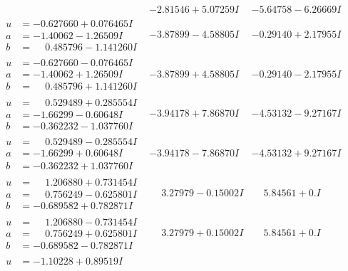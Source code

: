 \documentclass[1p]{elsarticle_modified}
\theoremstyle{definition}
\begin{document}
$$\begin{array}{c|c|c}
 & -2.81546 + 5.07259 I & -5.64758 - 6.26669 I \\ \hline\begin{aligned}
u &= -0.627660 + 0.076465 I \\
a &= -1.40062 - 1.26509 I \\
b &= \phantom{-}0.485796 - 1.141260 I\end{aligned}
 & -3.87899 - 4.58805 I & -0.29140 + 2.17955 I \\ \hline\begin{aligned}
u &= -0.627660 - 0.076465 I \\
a &= -1.40062 + 1.26509 I \\
b &= \phantom{-}0.485796 + 1.141260 I\end{aligned}
 & -3.87899 + 4.58805 I & -0.29140 - 2.17955 I \\ \hline\begin{aligned}
u &= \phantom{-}0.529489 + 0.285554 I \\
a &= -1.66299 - 0.60648 I \\
b &= -0.362232 - 1.037760 I\end{aligned}
 & -3.94178 + 7.86870 I & -4.53132 - 9.27167 I \\ \hline\begin{aligned}
u &= \phantom{-}0.529489 - 0.285554 I \\
a &= -1.66299 + 0.60648 I \\
b &= -0.362232 + 1.037760 I\end{aligned}
 & -3.94178 - 7.86870 I & -4.53132 + 9.27167 I \\ \hline\begin{aligned}
u &= \phantom{-}1.206880 + 0.731454 I \\
a &= \phantom{-}0.756249 - 0.625801 I \\
b &= -0.689582 + 0.782871 I\end{aligned}
 & \phantom{-}3.27979 - 0.15002 I & \phantom{-}5.84561 + 0. I\phantom{ +0.000000I} \\ \hline\begin{aligned}
u &= \phantom{-}1.206880 - 0.731454 I \\
a &= \phantom{-}0.756249 + 0.625801 I \\
b &= -0.689582 - 0.782871 I\end{aligned}
 & \phantom{-}3.27979 + 0.15002 I & \phantom{-}5.84561 + 0. I\phantom{ +0.000000I} \\ \hline\begin{aligned}
u &= -1.10228 + 0.89519 I \\

\end{aligned}
\end{array}$$
\end{document}
